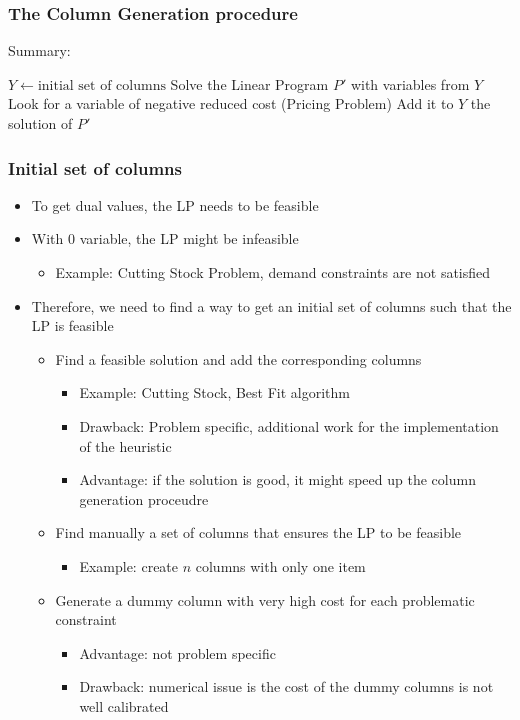 \documentclass[10pt]{beamer}
\begin{document}
\begin{frame}
  \frametitle{The Column Generation procedure}
  
  Summary:
  \begin{algorithmic}
    \State $Y \gets \text{initial set of columns}$
    \State Solve the Linear Program $P'$ with variables from $Y$
    \State Look for a variable of negative reduced cost (\alert{Pricing Problem})
    \State Add it to $Y$
    \Else
    \State \Return the solution of $P'$
    \EndIf
    \EndWhile
    \EndFunction
  \end{algorithmic}
\end{frame}

\begin{frame}
  \frametitle{Initial set of columns}

  \begin{itemize}
    \item To get dual values, the LP needs to be feasible
    \item With $0$ variable, the LP might be infeasible
      \begin{itemize}
        \item Example: Cutting Stock Problem, demand constraints are not satisfied
      \end{itemize}
    \item Therefore, we need to find a way to get an initial set of columns such that the LP is feasible
      \begin{itemize}
        \item Find a feasible solution and add the corresponding columns
          \begin{itemize}
            \item Example: Cutting Stock, Best Fit algorithm
            \item Drawback: Problem specific, additional work for the implementation of the heuristic
            \item Advantage: if the solution is good, it might speed up the column generation proceudre
          \end{itemize}
        \item Find manually a set of columns that ensures the LP to be feasible
          \begin{itemize}
            \item Example: create $n$ columns with only one item
          \end{itemize}
        \item Generate a dummy column with very high cost for each problematic constraint
          \begin{itemize}
            \item Advantage: not problem specific
            \item Drawback: numerical issue is the cost of the dummy columns is not well calibrated
          \end{itemize}
      \end{itemize}
  \end{itemize}
\end{frame}
\end{document}
